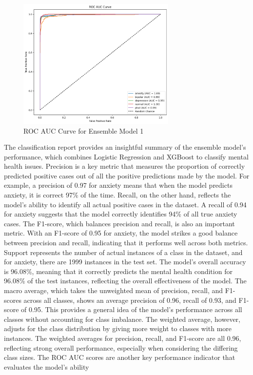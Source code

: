 \begin{figure}[h!]  
    \centering
    \includegraphics[width=0.7\textwidth]{Images/EM ROC.png}  
    \caption{ROC AUC Curve for Ensemble Model 1}
    \label{dfdl12443}  %
\end{figure}


\noindent
The classification report provides an insightful summary of the ensemble model's performance, which combines Logistic Regression and XGBoost to classify mental health issues. Precision is a key metric that measures the proportion of correctly predicted positive cases out of all the positive predictions made by the model. For example, a precision of 0.97 for anxiety means that when the model predicts anxiety, it is correct 97\% of the time. Recall, on the other hand, reflects the model's ability to identify all actual positive cases in the dataset. A recall of 0.94 for anxiety suggests that the model correctly identifies 94\% of all true anxiety cases. The F1-score, which balances precision and recall, is also an important metric. With an F1-score of 0.95 for anxiety, the model strikes a good balance between precision and recall, indicating that it performs well across both metrics. Support represents the number of actual instances of a class in the dataset, and for anxiety, there are 1999 instances in the test set. The model's overall accuracy is 96.08\%, meaning that it correctly predicts the mental health condition for 96.08\% of the test instances, reflecting the overall effectiveness of the model. The macro average, which takes the unweighted mean of precision, recall, and F1-scores across all classes, shows an average precision of 0.96, recall of 0.93, and F1-score of 0.95. This provides a general idea of the model's performance across all classes without accounting for class imbalance. The weighted average, however, adjusts for the class distribution by giving more weight to classes with more instances. The weighted averages for precision, recall, and F1-score are all 0.96, reflecting strong overall performance, especially when considering the differing class sizes. The ROC AUC scores are another key performance indicator that evaluates the model's ability 

